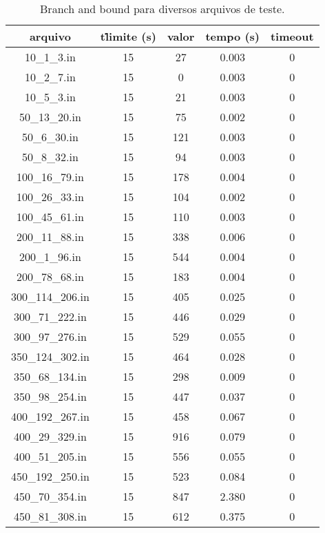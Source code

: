 \documentclass[7pt]{article}
\begin{document}
\begin{table}[H]
\centering
\setlength{\tabcolsep}{.16667em}
\caption{Branch and bound para diversos arquivos de teste.}
\begin{tabular}{|c|c|c|c|c|}
    \hline
    arquivo & t\. limite (s) & valor & tempo (s) & timeout\\
    \hline
    10\_1\_3.in & 15 & 27 & 0.003 & 0\\
    \hline
    10\_2\_7.in & 15 & 0 & 0.003 & 0\\
    \hline
    10\_5\_3.in & 15 & 21 & 0.003 & 0\\
    \hline
    50\_13\_20.in & 15 & 75 & 0.002 & 0\\
    \hline
    50\_6\_30.in & 15 & 121 & 0.003 & 0\\
    \hline
    50\_8\_32.in & 15 & 94 & 0.003 & 0\\
    \hline
    100\_16\_79.in & 15 & 178 & 0.004 & 0\\
    \hline
    100\_26\_33.in & 15 & 104 & 0.002 & 0\\
    \hline
    100\_45\_61.in & 15 & 110 & 0.003 & 0\\
    \hline
    200\_11\_88.in & 15 & 338 & 0.006 & 0\\
    \hline
    200\_1\_96.in & 15 & 544 & 0.004 & 0\\
    \hline
    200\_78\_68.in & 15 & 183 & 0.004 & 0\\
    \hline
    300\_114\_206.in & 15 & 405 & 0.025 & 0\\
    \hline
    300\_71\_222.in & 15 & 446 & 0.029 & 0\\
    \hline
    300\_97\_276.in & 15 & 529 & 0.055 & 0\\
    \hline
    350\_124\_302.in & 15 & 464 & 0.028 & 0\\
    \hline
    350\_68\_134.in & 15 & 298 & 0.009 & 0\\
    \hline
    350\_98\_254.in & 15 & 447 & 0.037 & 0\\
    \hline
    400\_192\_267.in & 15 & 458 & 0.067 & 0\\
    \hline
    400\_29\_329.in & 15 & 916 & 0.079 & 0\\
    \hline
    400\_51\_205.in & 15 & 556 & 0.055 & 0\\
    \hline
    450\_192\_250.in & 15 & 523 & 0.084 & 0\\
    \hline
    450\_70\_354.in & 15 & 847 & 2.380 & 0\\
    \hline
    450\_81\_308.in & 15 & 612 & 0.375 & 0\\

\end{tabular}
\end{table}
\end{document}
